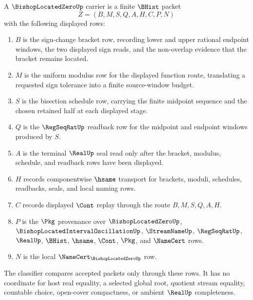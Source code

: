 \begin{definition}
\label{def:bishop-located-zero-carrier}
A $\BishopLocatedZeroUp$ carrier is a finite $\BHist$ packet
$$
Z=(B,M,S,Q,A,H,C,P,N)
$$
with the following displayed rows:
\begin{enumerate}
\item $B$ is the sign-change bracket row, recording lower and upper rational endpoint windows, the two displayed sign reads, and the non-overlap evidence that the bracket remains located.
\item $M$ is the uniform modulus row for the displayed function route, translating a requested sign tolerance into a finite source-window budget.
\item $S$ is the bisection schedule row, carrying the finite midpoint sequence and the chosen retained half at each displayed stage.
\item $Q$ is the $\RegSeqRatUp$ readback row for the midpoint and endpoint windows produced by $S$.
\item $A$ is the terminal $\RealUp$ seal read only after the bracket, modulus, schedule, and readback rows have been displayed.
\item $H$ records componentwise $\hsame$ transport for brackets, moduli, schedules, readbacks, seals, and local naming rows.
\item $C$ records displayed $\Cont$ replay through the route $B,M,S,Q,A,H$.
\item $P$ is the $\Pkg$ provenance over $\BishopLocatedZeroUp$, $\BishopLocatedIntervalOscillationUp$, $\StreamNameUp$, $\RegSeqRatUp$, $\RealUp$, $\BHist$, $\hsame$, $\Cont$, $\Pkg$, and $\NameCert$ rows.
\item $N$ is the local $\NameCert_{\BishopLocatedZeroUp}$ row.
\end{enumerate}
The classifier compares accepted packets only through these rows. It has no coordinate for host real equality, a selected global root, quotient stream equality, countable choice, open-cover compactness, or ambient $\RealUp$ completeness.
\end{definition}

